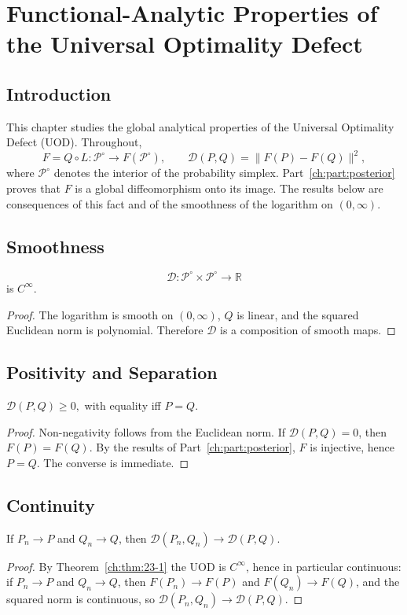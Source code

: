 \chapter[Functional-Analytic Properties]{Functional-Analytic Properties of the Universal Optimality Defect}\label{ch:sec:functional-analytic-properties-of-the-universal-optimal}
\section{Introduction}\label{ch:sec:introduction-analytic_uod-4}
This chapter studies the global analytical properties of the Universal
Optimality Defect (UOD). Throughout,
\[
F=Q\circ L:\mathcal P^\circ\rightarrow F(\mathcal P^\circ),
\qquad \mathcal D(P,Q)=\|F(P)-F(Q)\|^2,
\]
where \(\mathcal P^\circ\) denotes the interior of the
probability simplex. Part~\ref{ch:part:posterior} proves that \(F\) is a global
diffeomorphism onto its image. The results below are consequences of this fact and of the smoothness of the logarithm on $(0,\infty)$.
\section{Smoothness}\label{ch:sec:smoothness}
\begin{theorem}[Smoothness]
\label{ch:thm:23-1}
\[
\mathcal D:\mathcal P^\circ\times\mathcal P^\circ\rightarrow\mathbb R
\]
is \(C^\infty\).
\end{theorem}
\begin{proof} The logarithm is smooth on \((0,\infty)\), \(Q\) is
linear, and the squared Euclidean norm is polynomial. Therefore
\(\mathcal D\) is a composition of smooth maps. 
\end{proof}
\section{Positivity and Separation}\label{ch:sec:positivity-and-separation}
\begin{theorem}[Positivity]
\label{ch:thm:23-2}
$\mathcal D(P,Q)\ge0,$
with equality iff \(P=Q\).
\end{theorem}
\begin{proof} Non-negativity follows from the Euclidean norm. If
\(\mathcal D(P,Q)=0\), then \(F(P)=F(Q)\). By the results of Part~\ref{ch:part:posterior}, \(F\) is
injective, hence \(P=Q\). The converse is immediate. 
\end{proof}
\section{Continuity}\label{ch:sec:continuity}
\begin{theorem}[Continuity]
\label{ch:thm:23-3}
If \(P_n\to P\) and \(Q_n\to Q\), then
$\mathcal D(P_n,Q_n)\to\mathcal D(P,Q).$
\end{theorem}
\begin{proof} By Theorem~\ref{ch:thm:23-1} the UOD is \(C^\infty\), hence in particular continuous: if \(P_n\to P\) and \(Q_n\to Q\), then \(F(P_n)\to F(P)\) and \(F(Q_n)\to F(Q)\), and the squared norm is continuous, so \(\mathcal D(P_n,Q_n)\to\mathcal D(P,Q)\).
\end{proof}
